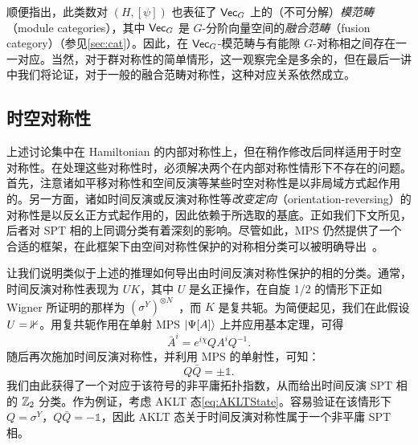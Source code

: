顺便指出，此类数对 $(H,[\psi])$ 也表征了 $\mathsf{Vec}_G$ 上的（不可分解）\emph{模范畴}（module categories），其中 $\mathsf{Vec}_G$ 是 $G$-分阶向量空间的\emph{融合范畴}（fusion category）（参见\cref{sec:cat}）。因此，在 $\mathsf{Vec}_G$-模范畴与有能隙 $G$-对称相之间存在一一对应。当然，对于群对称性的简单情形，这一观察完全是多余的，但在最后一讲中我们将论证，对于一般的融合范畴对称性，这种对应关系依然成立。
\subsection{时空对称性}
上述讨论集中在 Hamiltonian 的内部对称性上，但在稍作修改后同样适用于时空对称性。在处理这些对称性时，必须解决两个在内部对称性情形下不存在的问题。首先，注意诸如平移对称性和空间反演等某些时空对称性是以非局域方式起作用的。另一方面，诸如时间反演或反演对称性等\emph{改变定向}（orientation-reversing）的对称性是以反幺正方式起作用的，因此依赖于所选取的基底。正如我们下文所见，后者对 SPT 相的上同调分类有着深刻的影响。尽管如此，MPS 仍然提供了一个合适的框架，在此框架下由空间对称性保护的对称相分类可以被明确导出~\cite{Pollmann2009,Vancraeynest2022}。

让我们说明类似于上述的推理如何导出由时间反演对称性保护的相的分类。通常，时间反演对称性表现为 $UK$，其中 $U$ 是幺正操作，在自旋 1/2 的情形下正如 Wigner 所证明的那样为 $(\sigma^Y)^{\otimes N}$~\cite{Wigner1960}，而 $K$ 是复共轭。为简便起见，我们在此假设 $U=\mathbb 1$。用复共轭作用在单射 MPS $\ket{\Psi[A]}$ 上并应用基本定理，可得
\begin{equation}
    \bar A^i = e^{i\chi}QA^iQ^{-1}.
\end{equation}
随后再次施加时间反演对称性，并利用 MPS 的单射性，可知：
\begin{equation}\label{eq:TRProjective}
    Q\bar Q = \pm \mathbb 1.
\end{equation}
我们由此获得了一个对应于该符号的非平庸拓扑指数，从而给出时间反演 SPT 相的 $\mathbb Z_2$ 分类。作为例证，考虑 AKLT 态\cref{eq:AKLTState}。容易验证在该情形下 $Q=\sigma^Y$，$Q\bar{Q}=-\mathbb 1$，因此 AKLT 态关于时间反演对称性属于一个非平庸 SPT 相。

